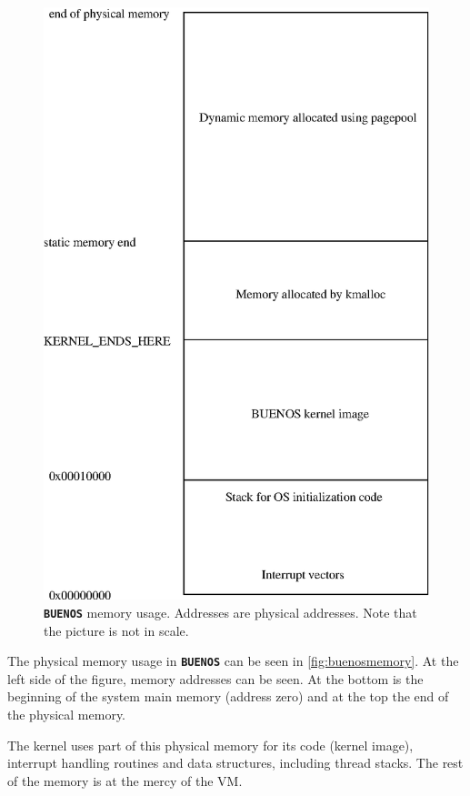 \documentclass[twoside,a4paper]{report}
\newlength{\tablewidth}
\newcommand{\buenos}{\texttt{\textbf{BUENOS}}}
\begin{document}
\begin{figure}
\begin{center}
\includegraphics[width=\tablewidth,angle=0]{pics/buenos_memory.eps}
\caption{\buenos{} memory usage. Addresses are physical addresses.
Note that the picture is not in scale.}
\label{fig:buenosmemory}
\end{center}
\end{figure}

The physical memory usage in \buenos{} can be seen in
\autoref{fig:buenosmemory}. At the left side of the figure, memory
addresses can be seen. At the bottom is the beginning of the system
main memory (address zero) and at the top the end of the physical
memory.

The kernel uses part of this physical memory for its code (kernel
image), interrupt handling routines and data structures, including
thread stacks. The rest of the memory is at the mercy of the VM.
\end{document}
